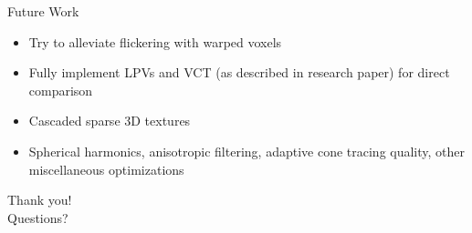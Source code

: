 \documentclass[10pt]{beamer}
\begin{document}
\begin{frame}{Future Work}


  \begin{itemize}
    \item Try to alleviate flickering with warped voxels %
    \item Fully implement LPVs and VCT (as described in research paper) for direct comparison %
    \item Cascaded sparse 3D textures %
    \item Spherical harmonics, anisotropic filtering, adaptive cone tracing quality, other miscellaneous optimizations %
  \end{itemize}
\end{frame}

\begin{frame}[standout]
  \LARGE Thank you!\\
  \vspace{1cm}
  \LARGE Questions?
\end{frame}

\end{document}
